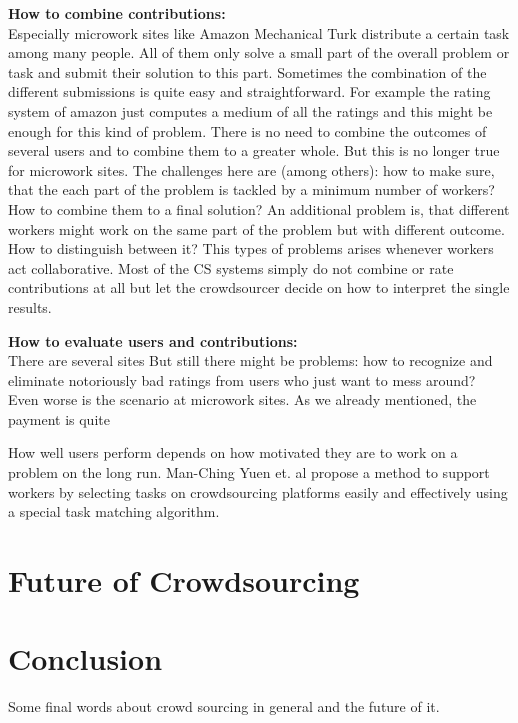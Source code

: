 \documentclass{acm_proc_article-sp}
\begin{document}
\textbf{How to combine contributions: }\\
Especially microwork sites like Amazon Mechanical Turk distribute a certain task among many people. All of them only solve a small part of the overall problem or task and submit their solution to this part. Sometimes the combination of the different submissions is quite easy and straightforward. For example the rating system of amazon just computes a medium of all the ratings and this might be enough for this kind of problem. There is no need to combine the outcomes of several users and to combine them to a greater whole. But this is no longer true for microwork sites. The challenges here are (among others): how to make sure, that the each part of the problem is tackled by a minimum number of workers? How to combine them to a final solution? An additional problem is, that different workers might work on the same part of the problem but with different outcome. How to distinguish between it? This types of problems arises whenever workers act collaborative. Most of the CS systems simply do not combine or rate contributions at all but let the crowdsourcer decide on how to interpret the single results.

\textbf{How to evaluate users and contributions: }\\ 
There are several sites 
But still there might be problems: how to recognize and eliminate notoriously bad ratings from users who just want to mess around?\\
Even worse is the scenario at microwork sites. As we already mentioned, the payment is quite 

How well users perform depends on how motivated they are to work on a problem on the long run. Man-Ching Yuen et. al propose a method to support workers by selecting tasks on crowdsourcing platforms easily and effectively using a special task matching algorithm\cite{yuen:select}.

\section{Future of Crowdsourcing}
\label{sect:future}

\section{Conclusion}
\label{sect:conclusion}

Some final words about crowd sourcing in general and the future of it.


%

%
%
\end{document}
